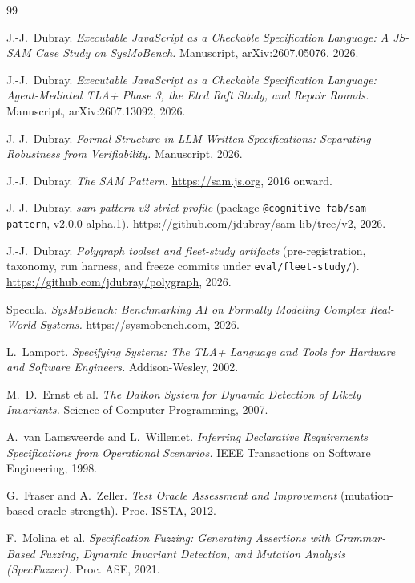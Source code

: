 \documentclass[11pt]{article}
\begin{document}
\begin{thebibliography}{99}

 J.-J.\ Dubray. \emph{Executable JavaScript as a Checkable
Specification Language: A JS-SAM Case Study on SysMoBench.} Manuscript,
arXiv:2607.05076, 2026.

 J.-J.\ Dubray. \emph{Executable JavaScript as a Checkable
Specification Language: Agent-Mediated TLA+ Phase 3, the Etcd Raft Study, and
Repair Rounds.} Manuscript, arXiv:2607.13092, 2026.

 J.-J.\ Dubray. \emph{Formal Structure in LLM-Written
Specifications: Separating Robustness from Verifiability.} Manuscript, 2026.

 J.-J.\ Dubray. \emph{The SAM Pattern.} \url{https://sam.js.org},
2016 onward.

 J.-J.\ Dubray. \emph{sam-pattern v2 strict profile} (package
\texttt{@cognitive-fab/sam-pattern}, v2.0.0-alpha.1).
\url{https://github.com/jdubray/sam-lib/tree/v2}, 2026.

 J.-J.\ Dubray. \emph{Polygraph toolset and fleet-study artifacts}
(pre-registration, taxonomy, run harness, and freeze commits under
\texttt{eval/fleet-study/}). \url{https://github.com/jdubray/polygraph}, 2026.

 Specula. \emph{SysMoBench: Benchmarking AI on Formally
Modeling Complex Real-World Systems.} \url{https://sysmobench.com}, 2026.

 L.\ Lamport. \emph{Specifying Systems: The TLA+ Language and
Tools for Hardware and Software Engineers.} Addison-Wesley, 2002.

 M.\ D.\ Ernst et al. \emph{The Daikon System for Dynamic
Detection of Likely Invariants.} Science of Computer Programming, 2007.

 A.\ van Lamsweerde and L.\ Willemet. \emph{Inferring
Declarative Requirements Specifications from Operational Scenarios.} IEEE
Transactions on Software Engineering, 1998.

 G.\ Fraser and A.\ Zeller. \emph{Test Oracle Assessment and
Improvement} (mutation-based oracle strength). Proc. ISSTA, 2012.

 F.\ Molina et al. \emph{Specification Fuzzing: Generating
Assertions with Grammar-Based Fuzzing, Dynamic Invariant Detection, and
Mutation Analysis (SpecFuzzer).} Proc. ASE, 2021.


\end{thebibliography}
\end{document}

